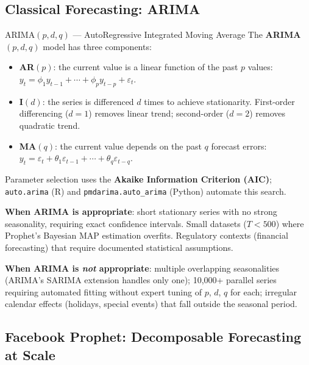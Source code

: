 \subsection{Classical Forecasting: ARIMA}
\label{subsec:arima}

\begin{defbox}{ARIMA$(p, d, q)$ — AutoRegressive Integrated Moving Average}
The \textbf{ARIMA}$(p, d, q)$ model has three components:
\begin{itemize}
  \item \textbf{AR$(p)$}: the current value is a linear function of the
        past $p$ values: $y_t = \phi_1 y_{t-1} + \cdots + \phi_p y_{t-p} + \varepsilon_t$.
  \item \textbf{I$(d)$}: the series is differenced $d$ times to achieve
        stationarity. First-order differencing ($d=1$) removes linear
        trend; second-order ($d=2$) removes quadratic trend.
  \item \textbf{MA$(q)$}: the current value depends on the past $q$
        forecast errors: $y_t = \varepsilon_t + \theta_1 \varepsilon_{t-1}
        + \cdots + \theta_q \varepsilon_{t-q}$.
\end{itemize}
Parameter selection uses the \textbf{Akaike Information Criterion (AIC)};
\texttt{auto.arima} (R) and \texttt{pmdarima.auto\_arima} (Python)
automate this search.

\textbf{When ARIMA is appropriate}: short stationary series with no
strong seasonality, requiring exact confidence intervals. Small
datasets ($T < 500$) where Prophet's Bayesian MAP estimation overfits.
Regulatory contexts (financial forecasting) that require documented
statistical assumptions.

\textbf{When ARIMA is \emph{not} appropriate}: multiple overlapping
seasonalities (ARIMA's SARIMA extension handles only one); 10{,}000+
parallel series requiring automated fitting without expert tuning of
$p$, $d$, $q$ for each; irregular calendar effects (holidays, special
events) that fall outside the seasonal period.
\end{defbox}

\subsection{Facebook Prophet: Decomposable Forecasting at Scale}
\label{subsec:prophet}

